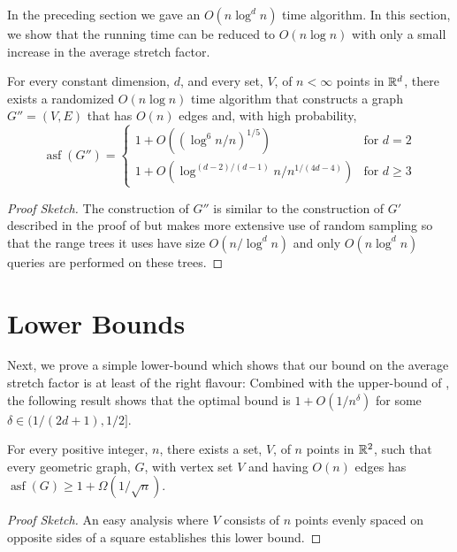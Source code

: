 \documentclass{patmorin}
\DeclareMathOperator{\asf}{asf}
\begin{document}
In the preceding section we gave an $O(n\log^d n)$ time algorithm.
In this section, we show that the running time can be reduced to $O(n\log
n)$ with only a small increase in the average stretch factor.

\begin{thm}
  For every constant dimension, $d$, and every set, $V$, of $n<\infty$
  points in $\mathbb{R}^d$, there exists a randomized $O(n\log n)$ time
  algorithm that constructs a graph $G''=(V,E)$ that has $O(n)$ edges
  and, with high probability, 
  \[
      \asf(G'')=\begin{cases}
         1+ O((\log^{6} n/n)^{1/5}) & \text{for $d=2$} \\
         1+ O(\log^{(d-2)/(d-1)}n/n^{1/(4d-4)}) 
                  & \text{for $d\ge 3$} 
      \end{cases}
  \]
\end{thm}

\begin{proof}[Proof Sketch]
  The construction of $G''$ is similar to the construction of $G'$
  described in the proof of  but makes more extensive
  use of random sampling so that the range trees it uses have size
  $O(n/\log^d n)$ and only $O(n\log^d n)$ queries are performed on
  these trees.
\end{proof}



\section{Lower Bounds}

Next, we prove a simple lower-bound which shows that our bound on the
average stretch factor is at least of the right flavour: Combined with
the upper-bound of , the following result shows that
the optimal bound is $1+O(1/n^{\delta})$ for some $\delta\in(1/(2d+1),1/2]$.

\begin{thm}
  For every positive integer, $n$, there exists a set, $V$, of $n$
  points in $\mathbb{R}^2$, such that every geometric graph, $G$, with vertex
  set $V$ and having $O(n)$ edges has $\asf(G)\ge 1 + \Omega(1/\sqrt{n})$.
\end{thm}

\begin{proof}[Proof Sketch]
  An easy analysis where $V$ consists of $n$ points evenly spaced on
  opposite sides of a square establishes this lower bound.
\end{proof}
\end{document}
